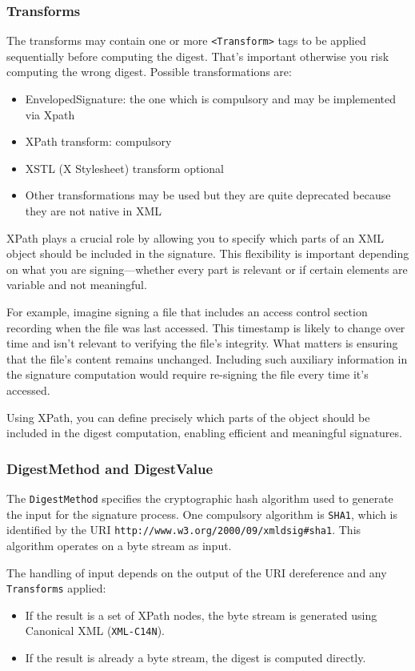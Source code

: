 \subsubsection{Transforms}
The transforms may contain one or more \texttt{<Transform>}
tags to be applied sequentially before computing the digest. That’s
important otherwise you risk computing the wrong digest. Possible
transformations are:
\begin{itemize}
  \item EnvelopedSignature: the one which is compulsory and may be
    implemented via Xpath
  \item XPath transform: compulsory
  \item XSTL (X Stylesheet) transform optional
  \item Other transformations may be used but they are quite
    deprecated because they are not native in XML
\end{itemize}

XPath plays a crucial role by allowing you to specify which parts of
an XML object should be included in the signature. This flexibility is
important depending on what you are signing—whether every part is
relevant or if certain elements are variable and not meaningful. 

For example, imagine signing a file that includes an access control
section recording when the file was last accessed. This timestamp is
likely to change over time and isn’t relevant to verifying the file’s
integrity. What matters is ensuring that the file’s content remains
unchanged. Including such auxiliary information in the signature
computation would require re-signing the file every time it’s
accessed. 

Using XPath, you can define precisely which parts of the object should
be included in the digest computation, enabling efficient and
meaningful signatures.

\subsubsection{DigestMethod and DigestValue}

The \texttt{DigestMethod} specifies the cryptographic hash algorithm
used to generate the input for the signature process. One compulsory
algorithm is \texttt{SHA1}, which is identified by the URI
\texttt{http://www.w3.org/2000/09/xmldsig\#sha1}. This algorithm
operates on a byte stream as input.

The handling of input depends on the output of the URI dereference and
any \texttt{Transforms} applied:
\begin{itemize}
  \item If the result is a set of XPath nodes, the byte stream is
    generated using Canonical XML (\texttt{XML-C14N}).
  \item If the result is already a byte stream, the digest is
    computed directly.
\end{itemize}

